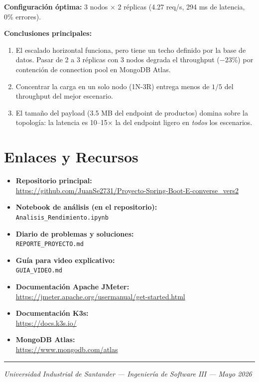 \documentclass[11pt,a4paper]{article}
\begin{document}
\textbf{Configuración óptima:} 3 nodos $\times$ 2 réplicas (4.27 req/s, 294 ms de latencia, 0\% errores).

\textbf{Conclusiones principales:}
\begin{enumerate}
    \item El escalado horizontal funciona, pero tiene un techo definido por la base de datos. Pasar de 2 a 3 réplicas con 3 nodos degrada el throughput ($-23$\%) por contención de connection pool en MongoDB Atlas.
    \item Concentrar la carga en un solo nodo (1N-3R) entrega menos de $1/5$ del throughput del mejor escenario.
    \item El tamaño del payload (3.5 MB del endpoint de productos) domina sobre la topología: la latencia es 10--15$\times$ la del endpoint ligero en \emph{todos} los escenarios.
\end{enumerate}

\section{Enlaces y Recursos}

\begin{itemize}
    \item \textbf{Repositorio principal:} \\
    \url{https://github.com/JuanSe2731/Proyecto-Spring-Boot-E-converse_vers2}

    \item \textbf{Notebook de análisis (en el repositorio):} \\
    \texttt{Analisis\_Rendimiento.ipynb}

    \item \textbf{Diario de problemas y soluciones:} \\
    \texttt{REPORTE\_PROYECTO.md}

    \item \textbf{Guía para video explicativo:} \\
    \texttt{GUIA\_VIDEO.md}

    \item \textbf{Documentación Apache JMeter:} \\
    \url{https://jmeter.apache.org/usermanual/get-started.html}

    \item \textbf{Documentación K3s:} \\
    \url{https://docs.k3s.io/}

    \item \textbf{MongoDB Atlas:} \\
    \url{https://www.mongodb.com/atlas}
\end{itemize}

\vspace{1cm}
\hrule
\vspace{0.3cm}
\begin{center}
\small\textit{Universidad Industrial de Santander --- Ingeniería de Software III --- Mayo 2026}
\end{center}
\end{document}
